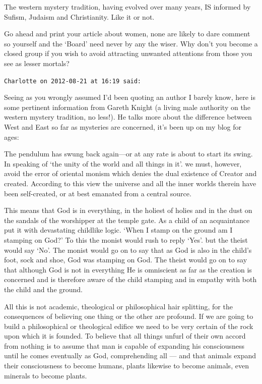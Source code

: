 \begin{footnotesize}
\begin{sffamily}
The western mystery tradition, having evolved over many years, IS informed by Sufism, Judaism and Christianity. Like it or not. 

Go ahead and print your article about women, none are likely to dare comment so yourself and the `Board' need never by any the wiser. Why don't you become a closed group if you wish to avoid attracting unwanted attentions from those you see as lesser mortals?


\hfill

\texttt{Charlotte on 2012-08-21 at 16:19 said: }

Seeing as you wrongly assumed I'd been quoting an author I barely know, here is some pertinent information from Gareth Knight (a living male authority on the western mystery tradition, no less!). He talks more about the difference between West and East so far as mysteries are concerned, it's been up on my blog for ages:

The pendulum has swung back again—or at any rate is about to start its swing. In speaking of `the unity of the world and all things in it'. we must, however, avoid the error of oriental monism which denies the dual existence of Creator and created. According to this view the universe and all the inner worlds therein have been self-created, or at best emanated from a central source.

This means that God is in everything, in the holiest of holies and in the dust on the sandals of the worshipper at the temple gate. As a child of an acquaintance put it with devastating childlike logic. `When I stamp on the ground am I stamping on God?' To this the monist would rush to reply `Yes'. but the theist would say `No'. The monist would go on to say that as God is also in the child's foot, sock and shoe, God was stamping on God. The theist would go on to say that although God is not in everything He is omniscient as far as the creation is concerned and is therefore aware of the child stamping and in empathy with both the child and the ground.

All this is not academic, theological or philosophical hair splitting, for the consequences of believing one thing or the other are profound. If we are going to build a philosophical or theological edifice we need to be very certain of the rock upon which it is founded. To believe that all things unfurl of their own accord from nothing is to assume that man is capable of expanding his consciousness until he comes eventually as God, comprehending all — and that animals expand their consciousness to become humans, plants likewise to become animals, even minerals to become plants.


\end{sffamily}
\end{footnotesize}
